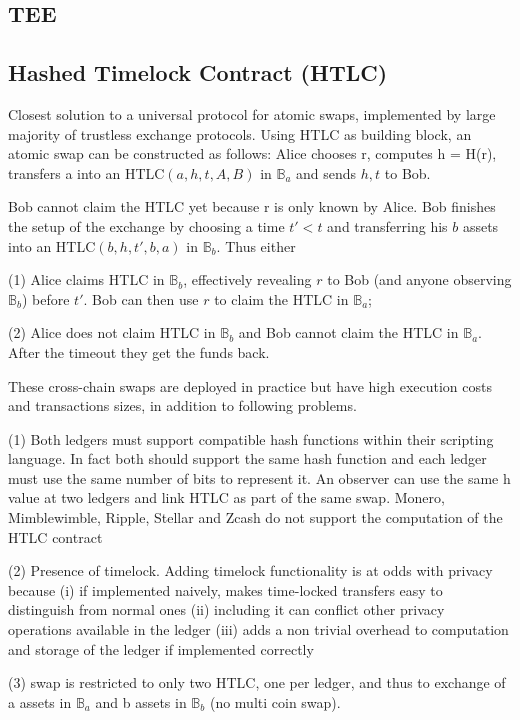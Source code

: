 \documentclass{article}      	%
\begin{document}
\subsection{TEE}
\subsection{Hashed Timelock Contract (HTLC)}

Closest solution to a universal protocol for atomic swaps, implemented by large majority of trustless exchange protocols. Using HTLC as building block, an atomic swap can be constructed as follows: Alice chooses r, computes h = H(r), transfers a into an HTLC$(a, h, t, A, B)$ in $\mathbb{B}_a$ and sends $h,t$ to Bob.

Bob cannot claim the HTLC yet because r is only known by Alice. Bob finishes the setup of the exchange by choosing a time $t' < t$ and transferring his $b$ assets into an HTLC$(b, h, t', b, a)$ in $\mathbb{B}_b$. Thus either

(1) Alice claims HTLC in $\mathbb{B}_b$, effectively revealing $r$ to Bob (and anyone observing $\mathbb{B}_b$) before $t'$. Bob can then use $r$ to claim the HTLC in $\mathbb{B}_a$;

(2) Alice does not claim HTLC in $\mathbb{B}_b$ and Bob cannot claim the HTLC in $\mathbb{B}_a$. After the timeout they get the funds back.

These cross-chain swaps are deployed in practice but have high execution costs and transactions sizes, in addition to following problems.

(1) Both ledgers must support compatible hash functions within their scripting language. In fact both should support the same hash function and each ledger must use the same number of bits to represent it. An observer can use the same h value at two ledgers and link HTLC as part of the same swap. Monero, Mimblewimble, Ripple, Stellar and Zcash do not support the computation of the HTLC contract

(2) Presence of timelock. Adding timelock functionality is at odds with privacy because (i) if implemented naively, makes time-locked transfers easy to distinguish from normal ones (ii) including it can conflict other privacy operations available in the ledger (iii) adds a non trivial overhead to computation and storage of the ledger if implemented correctly

(3) swap is restricted to only two HTLC, one per ledger, and thus to exchange of a assets in $\mathbb{B}_a$ and b assets in $\mathbb{B}_b$ (no multi coin swap).
\end{document}
